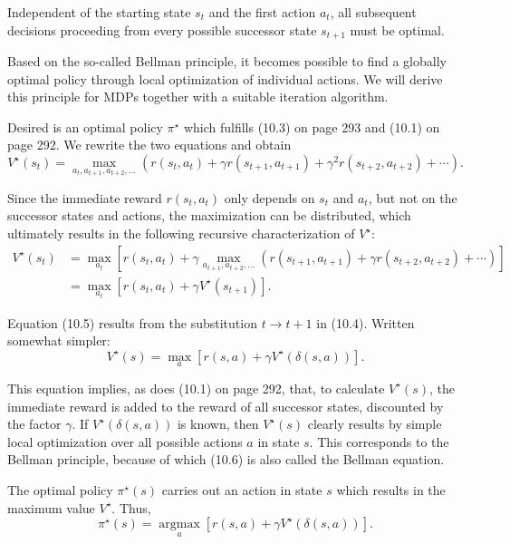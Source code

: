 \documentclass[10pt]{book}
\begin{document}
Independent of the starting state $s_{t}$ and the first action $a_{t}$, all subsequent decisions proceeding from every possible successor state $s_{t+1}$ must be optimal.

Based on the so-called Bellman principle, it becomes possible to find a globally optimal policy through local optimization of individual actions. We will derive this principle for MDPs together with a suitable iteration algorithm.

Desired is an optimal policy $\pi^{\star}$ which fulfills (10.3) on page 293 and (10.1) on page 292. We rewrite the two equations and obtain
\begin{equation*}
V^{\star}\left(s_{t}\right)=\max _{a_{t}, a_{t+1}, a_{t+2}, \ldots}\left(r\left(s_{t}, a_{t}\right)+\gamma r\left(s_{t+1}, a_{t+1}\right)+\gamma^{2} r\left(s_{t+2}, a_{t+2}\right)+\cdots\right) . \tag{10.4}
\end{equation*}

Since the immediate reward $r\left(s_{t}, a_{t}\right)$ only depends on $s_{t}$ and $a_{t}$, but not on the successor states and actions, the maximization can be distributed, which ultimately results in the following recursive characterization of $V^{\star}$:
\begin{align*}
V^{\star}\left(s_{t}\right) & =\max _{a_{t}}\left[r\left(s_{t}, a_{t}\right)+\gamma \max _{a_{t+1}, a_{t+2}, \ldots}\left(r\left(s_{t+1}, a_{t+1}\right)+\gamma r\left(s_{t+2}, a_{t+2}\right)+\cdots\right)\right] \\
& =\max _{a_{t}}\left[r\left(s_{t}, a_{t}\right)+\gamma V^{\star}\left(s_{t+1}\right)\right] . \tag{10.5}
\end{align*}

Equation (10.5) results from the substitution $t \rightarrow t+1$ in (10.4). Written somewhat simpler:
\begin{equation*}
V^{\star}(s)=\max _{a}\left[r(s, a)+\gamma V^{\star}(\delta(s, a))\right] . \tag{10.6}
\end{equation*}

This equation implies, as does (10.1) on page 292, that, to calculate $V^{\star}(s)$, the immediate reward is added to the reward of all successor states, discounted by the factor $\gamma$. If $V^{\star}(\delta(s, a))$ is known, then $V^{\star}(s)$ clearly results by simple local optimization over all possible actions $a$ in state $s$. This corresponds to the Bellman principle, because of which (10.6) is also called the Bellman equation.

The optimal policy $\pi^{\star}(s)$ carries out an action in state $s$ which results in the maximum value $V^{\star}$. Thus,
\begin{equation*}
\pi^{\star}(s)=\underset{a}{\operatorname{argmax}}\left[r(s, a)+\gamma V^{\star}(\delta(s, a))\right] . \tag{10.7}
\end{equation*}
\end{document}
